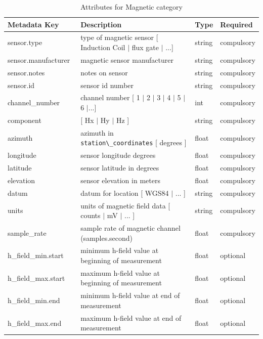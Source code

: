 \documentclass{article}
\begin{document}
\begin{table}[htb!]
    \caption[Attributes for Magnetic Channel]{Attributes for Magnetic category}
    \begin{tabular}{|l|p{3in}|l|l|}
        \hline
        \textbf{Metadata Key} & \textbf{Description} & \textbf{Type} & \textbf{Required} \\ \hline
        sensor.type\ & type of magnetic sensor [ Induction Coil $|$ flux gate $|$ ...] & string & compulsory \\ \hline
        sensor.manufacturer\ & magnetic sensor manufacturer & string &  compulsory \\ \hline
        sensor.notes\ & notes on sensor & string & compulsory \\ \hline
        sensor.id\ & sensor id number & string &  compulsory \\ \hline
        channel\_number\ & channel number [ 1 $|$ 2 $|$ 3 $|$ 4 $|$ 5 $|$ 6 $|$...] & int &  compulsory \\ \hline
        component\ & [ Hx $|$ Hy $|$ Hz ] & string  &  compulsory \\ \hline
        azimuth\ & azimuth in \verb|station\_coordinates| [ degrees ]& float & compulsory \\ \hline
        longitude\ & sensor longitude degrees & float & compulsory \\ \hline
        latitude\ & sensor latitude in degrees & float &  compulsory \\ \hline
        elevation\ & sensor elevation in meters & float &  compulsory \\ \hline
        datum\ & datum for location [ WGS84 $|$ ... ] & string &  compulsory\\ \hline
        units\ & units of magnetic field data [ counts $|$ mV $|$ ... ] & string &  compulsory \\ \hline
        sample\_rate\ & sample rate of magnetic channel (samples.second) & float &  compulsory \\ \hline
        h\_field\_min.start\ & minimum h-field value at beginning of measurement & float &  optional \\ \hline
        h\_field\_max.start\ & maximum h-field value at beginning of measurement & float &  optional\\ \hline
        h\_field\_min.end\ & minimum h-field value at end of measurement & float &  optional\\ \hline
        h\_field\_max.end\ & maximum h-field value at end of measurement & float &  optional\\ \hline

\end{tabular}
\end{table}
\end{document}
